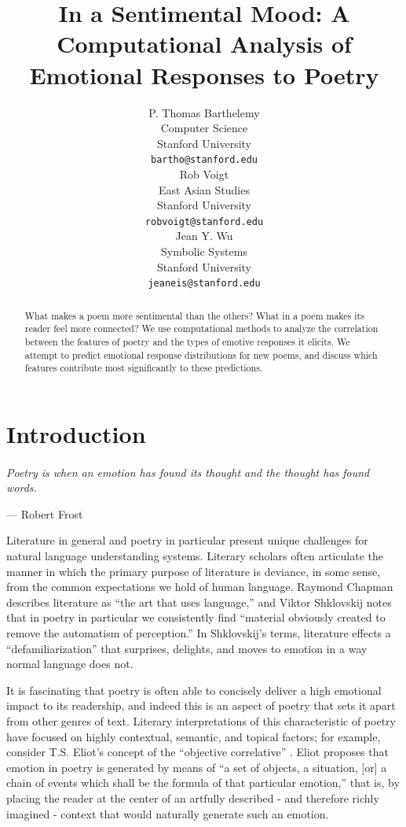 \documentclass[11pt]{article}
\title{In a Sentimental Mood: A Computational Analysis of Emotional Responses to Poetry}
\author{P. Thomas Barthelemy \\
  Computer Science\\
  Stanford University \\
  {\tt bartho@stanford.edu} \\\And
  Rob Voigt \\
  East Asian Studies \\
  Stanford University \\
  {\tt robvoigt@stanford.edu} \\\And
  Jean Y. Wu \\
  Symbolic Systems  \\
  Stanford University\\
  {\tt jeaneis@stanford.edu} \\}
\date{}
\begin{document}
\maketitle
\begin{abstract}
What makes a poem more sentimental than the others? What in a poem makes its reader feel more connected? We use computational methods to analyze the correlation between the features of poetry and the types of emotive responses it elicits.
We attempt to predict emotional response distributions for new poems, and discuss which features contribute most significantly to these predictions.
\end{abstract}

\section{Introduction}

\paragraph{}
\emph{Poetry is when an emotion has found its thought and the thought has found words.}
\begin{flushright}
--- Robert Frost\\
\end{flushright}


Literature in general and poetry in particular present unique challenges for natural language understanding systems. Literary scholars often articulate the manner in which the primary purpose of literature is deviance, in some sense, from the common expectations we hold of human language. Raymond Chapman describes literature as ``the art that uses language,'' and Viktor Shklovskij notes that in poetry in particular we consistently find ``material obviously created to remove the automatism of perception.'' In Shklovskij's terms, literature effects a ``defamiliarization'' that surprises, delights, and moves to emotion in a way normal language does not.

It is fascinating that poetry is often able to concisely deliver a high emotional impact to its readership, and indeed this is an aspect of poetry that sets it apart from other genres of text. Literary interpretations of this characteristic of poetry have focused on highly contextual, semantic, and topical factors; for example, consider T.S. Eliot's concept of the ``objective correlative'' \cite{eliot1920hamlets}. Eliot proposes that emotion in poetry is generated by means of ``a set of objects, a situation, [or] a chain of events which shall be the formula of that particular emotion,'' that is, by placing the reader at the center of an artfully described - and therefore richly imagined - context that would naturally generate such an emotion.
\end{document}
